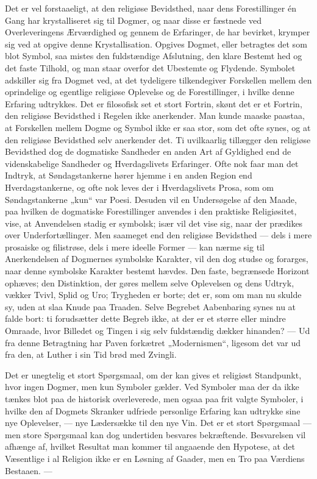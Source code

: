 \documentclass[12pt,a4paper,openany]{book}
\newcommand{\opage}[1]{\marginnote{\footnotesize\textit{[#1]}}}
\begin{document}
Det er vel forstaaeligt, at den religiøse Bevidsthed, naar dens
Forestillinger én Gang har krystalliseret sig til Dogmer, og naar disse
er fæstnede ved Overleveringens Ærværdighed og gennem de Erfaringer, de
har bevirket, krymper sig ved at opgive denne Krystallisation. Opgives
Dogmet, eller betragtes det som blot Symbol, saa mistes den fuldstændige
Afslutning, den klare Bestemt%
\opage{138}hed og det faste Tilhold, og man staar overfor det Ubestemte
og Flydende. Symbolet adskiller sig fra Dogmet ved, at det tydeligere
tilkendegiver Forskellen mellem den oprindelige og egentlige religiøse
Oplevelse og de Forestillinger, i hvilke denne Erfaring udtrykkes. Det
er filosofisk set et stort Fortrin, skønt det er et Fortrin, den
religiøse Bevidsthed i Regelen ikke anerkender. Man kunde maaske
paastaa, at Forskellen mellem Dogme og Symbol ikke er saa stor, som det
ofte synes, og at den religiøse Bevidsthed selv anerkender det. Ti
uvilkaarlig tillægger den religiøse Bevidsthed dog de dogmatiske
Sandheder en anden Art af Gyldighed end de videnskabelige Sandheder og
Hverdagslivets Erfaringer. Ofte nok faar man det Indtryk, at
Søndagstankerne hører hjemme i en anden Region end Hverdagstankerne, og
ofte nok leves der i Hverdagslivets Prosa, som om Søndagstankerne „kun“
var Poesi. Desuden vil en Undersøgelse af den Maade, paa hvilken de
dogmatiske Forestillinger anvendes i den praktiske Religiøsitet, vise,
at Anvendelsen stadig er symbolsk; især vil det vise sig, naar der
prædikes over Underfortællinger. Men saameget end den religiøse
Bevidsthed --- dels i mere prosaiske og filistrøse, dels i mere ideelle
Former --- kan nærme sig til Anerkendelsen af Dogmernes symbolske
Karakter, vil den dog studse og forarges, naar denne symbolske Karakter
bestemt hævdes. Den faste, begrænsede Horizont ophæves; den Distinktion,
der gøres mellem selve Oplevelsen og dens Udtryk, vækker Tvivl, Splid og
Uro; Trygheden er borte; det er, som om man nu skulde sy, uden at slaa
Knude paa Traaden. Selve Begrebet Aabenbaring synes nu at falde bort: ti
forudsætter dette Begreb ikke, at der er et større eller mindre Omraade,
hvor Billedet og Tingen i sig selv fuldstændig dækker hinanden? --- Ud
fra denne Betragtning har Paven forkætret „Modernismen“, ligesom det var
ud fra den, at Luther i sin Tid brød med Zvingli.

Det er unegtelig et stort Spørgsmaal, om der kan gives et religiøst
Standpunkt, hvor ingen Dogmer, men kun Symboler gælder. Ved Symboler maa
der da ikke tænkes blot paa de historisk overleverede, men ogsaa paa
frit valgte Symboler, i hvilke den af Dogmets Skranker udfriede
personlige Erfaring kan udtrykke sine nye Oplevelser, --- nye Lædersække
til den nye Vin. Det er et stort Spørgsmaal --- men store Spørgsmaal kan
dog undertiden besvares bekræftende. Besvarelsen vil afhænge af, hvilket
Resultat man kommer til angaaende den Hypotese, at det Væsentlige i al
Religion ikke er en Løsning af Gaader, men en Tro paa Værdiens Bestaaen.
---
\end{document}
